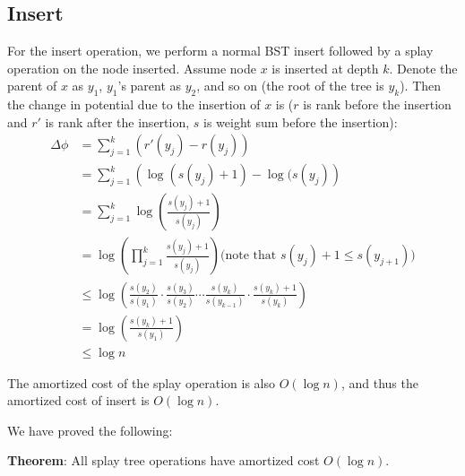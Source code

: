 \documentclass{article}
\begin{document}
\subsection{Insert}
For the insert operation, we perform a normal BST insert followed by
a splay operation on the node inserted. Assume node $x$ is inserted at
depth $k$. Denote the parent of $x$ as $y_{1}$, $y_{1}$'s parent as
$y_{2}$, and so on (the root of the tree is $y_{k}$). Then the change
in potential due to the insertion of $x$ is ($r$ is rank before the
insertion and $r'$ is rank after the insertion, $s$ is weight sum
before the insertion):
\begin{align*}
  \Delta\phi & = \sum_{j = 1}^{k} \left(r'(y_{j}) -
    r(y_{j})\right) \\
  & = \sum_{j = 1}^{k} \left(\log(s(y_{j}) + 1) -
    \log(s(y_{j})\right) \\
  & = \sum_{j = 1}^{k}
    \log\left(\frac{s(y_{j}) + 1}{s(y_{j})}\right) \\
  & = \log\left(\prod_{j = 1}^{k}
    \frac{s(y_{j}) + 1}{s(y_{j})}\right)
    \textrm{(note that $s(y_{j}) + 1 \le s(y_{j + 1})$)} \\
  & \le \log\left(\frac{s(y_{2})}{s(y_{1})} \cdot
    \frac{s(y_{3})}{s(y_{2})} \cdots
    \frac{s(y_{k})}{s(y_{k - 1})} \cdot
    \frac{s(y_{k}) + 1}{s(y_{k})}\right) \\
  & = \log\left(\frac{s(y_{k}) + 1}{s(y_{1})}\right) \\
  & \le \log n
\end{align*}

The amortized cost of the splay operation is also $O(\log n)$, and
thus the amortized cost of insert is $O(\log n)$.

We have proved the following:

\textbf{Theorem}:
All splay tree operations have amortized cost $O(\log n)$.
\end{document}
